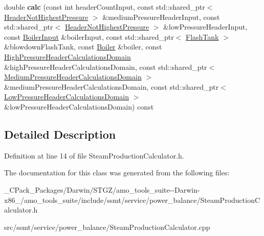 \begin{DoxyCompactItemize}
\item 
\mbox{\label{class_steam_production_calculator_acf8b2db93d77f02504b9c07f1412e74b}} 
double {\bfseries calc} (const int header\+Count\+Input, const std\+::shared\+\_\+ptr$<$ \hyperlink{class_header_not_highest_pressure}{Header\+Not\+Highest\+Pressure} $>$ \&medium\+Pressure\+Header\+Input, const std\+::shared\+\_\+ptr$<$ \hyperlink{class_header_not_highest_pressure}{Header\+Not\+Highest\+Pressure} $>$ \&low\+Pressure\+Header\+Input, const \hyperlink{class_boiler_input}{Boiler\+Input} \&boiler\+Input, const std\+::shared\+\_\+ptr$<$ \hyperlink{class_flash_tank}{Flash\+Tank} $>$ \&blowdown\+Flash\+Tank, const \hyperlink{class_boiler}{Boiler} \&boiler, const \hyperlink{class_high_pressure_header_calculations_domain}{High\+Pressure\+Header\+Calculations\+Domain} \&high\+Pressure\+Header\+Calculations\+Domain, const std\+::shared\+\_\+ptr$<$ \hyperlink{class_medium_pressure_header_calculations_domain}{Medium\+Pressure\+Header\+Calculations\+Domain} $>$ \&medium\+Pressure\+Header\+Calculations\+Domain, const std\+::shared\+\_\+ptr$<$ \hyperlink{class_low_pressure_header_calculations_domain}{Low\+Pressure\+Header\+Calculations\+Domain} $>$ \&low\+Pressure\+Header\+Calculations\+Domain) const
\end{DoxyCompactItemize}


\subsection{Detailed Description}


Definition at line 14 of file Steam\+Production\+Calculator.\+h.



The documentation for this class was generated from the following files\+:\begin{DoxyCompactItemize}
\item 
\+\_\+\+C\+Pack\+\_\+\+Packages/\+Darwin/\+S\+T\+G\+Z/amo\+\_\+tools\+\_\+suite-\/-\/\+Darwin-\/x86\+\_/amo\+\_\+tools\+\_\+suite/include/ssmt/service/power\+\_\+balance/Steam\+Production\+Calculator.\+h\item 
src/ssmt/service/power\+\_\+balance/Steam\+Production\+Calculator.\+cpp\end{DoxyCompactItemize}
